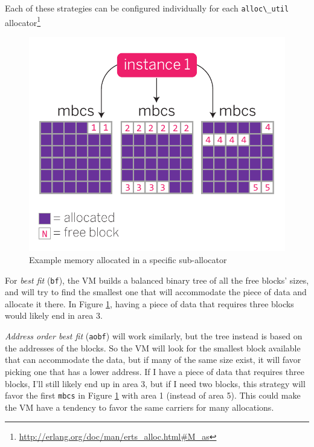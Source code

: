 \documentclass[11pt, oneside]{book}   	%
\newcommand{\term}[1]{\Verb`#1`}
\begin{document}
Each of these strategies can be configured individually for each \term{alloc\_util} allocator\footnote{\href{http://erlang.org/doc/man/erts\_alloc.html\#M\_as}{http://erlang.org/doc/man/erts\_alloc.html\#M\_as}}

\begin{figure}
  \includegraphics{allocation-strategy-1.pdf}%
  \caption{Example memory allocated in a specific sub-allocator}%
   \label{fig:allocation-strategy-1}
\end{figure}

For \emph{best fit} (\term{bf}), the VM builds a balanced binary tree of all the free blocks' sizes, and will try to find the smallest one that will accommodate the piece of data and allocate it there. In Figure \ref{fig:allocation-strategy-1}, having a piece of data that requires three blocks would likely end in area 3.

\emph{Address order best fit} (\term{aobf}) will work similarly, but the tree instead is based on the addresses of the blocks. So the VM will look for the smallest block available that can accommodate the data, but if many of the same size exist, it will favor picking one that has a lower address. If I have a piece of data that requires three blocks, I'll still likely end up in area 3, but if I need two blocks, this strategy will favor the first \term{mbcs} in Figure \ref{fig:allocation-strategy-1} with area 1 (instead of area 5). This could make the VM have a tendency to favor the same carriers for many allocations.
\end{document}
